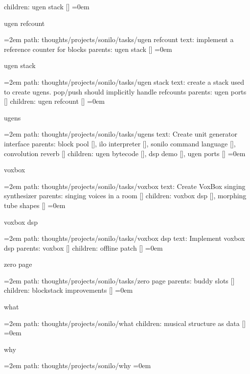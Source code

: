 \smallskip
children: ugen stack []
\smallskip
\leftskip=0em
\par\endgroup
\bigskip
{}
ugen refcount
\smallskip
\par\begingroup
\leftskip=2em
path: thoughts/projects/sonilo/tasks/ugen refcount
\smallskip
text:  implement a reference counter for blocks
\smallskip
parents:  ugen stack []
\smallskip
\leftskip=0em
\par\endgroup
\bigskip
{}
ugen stack
\smallskip
\par\begingroup
\leftskip=2em
path: thoughts/projects/sonilo/tasks/ugen stack
\smallskip
text:  create a stack used to create ugens. pop/push should implicitly handle refcounts
\smallskip
parents:  ugen ports []
\smallskip
children: ugen refcount []
\smallskip
\leftskip=0em
\par\endgroup
\bigskip
{}
ugens
\smallskip
\par\begingroup
\leftskip=2em
path: thoughts/projects/sonilo/tasks/ugens
\smallskip
text:  Create unit generator interface
\smallskip
parents:  block pool [], ilo interpreter [], sonilo command language [], convolution reverb []
\smallskip
children: ugen bytecode [], dsp demo [], ugen ports []
\smallskip
\leftskip=0em
\par\endgroup
\bigskip
{}
voxbox
\smallskip
\par\begingroup
\leftskip=2em
path: thoughts/projects/sonilo/tasks/voxbox
\smallskip
text:  Create VoxBox singing synthesizer
\smallskip
parents:  singing voices in a room []
\smallskip
children: voxbox dsp [], morphing tube shapes []
\smallskip
\leftskip=0em
\par\endgroup
\bigskip
{}
voxbox dsp
\smallskip
\par\begingroup
\leftskip=2em
path: thoughts/projects/sonilo/tasks/voxbox dsp
\smallskip
text:  Implement voxbox dsp
\smallskip
parents:  voxbox []
\smallskip
children: offline patch []
\smallskip
\leftskip=0em
\par\endgroup
\bigskip
{}
zero page
\smallskip
\par\begingroup
\leftskip=2em
path: thoughts/projects/sonilo/tasks/zero page
\smallskip
parents:  buddy slots []
\smallskip
children: blockstack improvements []
\smallskip
\leftskip=0em
\par\endgroup
\bigskip
{}
what
\smallskip
\par\begingroup
\leftskip=2em
path: thoughts/projects/sonilo/what
\smallskip
children: musical structure as data []
\smallskip
\leftskip=0em
\par\endgroup
\bigskip
{}
why
\smallskip
\par\begingroup
\leftskip=2em
path: thoughts/projects/sonilo/why
\smallskip
\leftskip=0em
\par\endgroup
\bigskip
\bye
